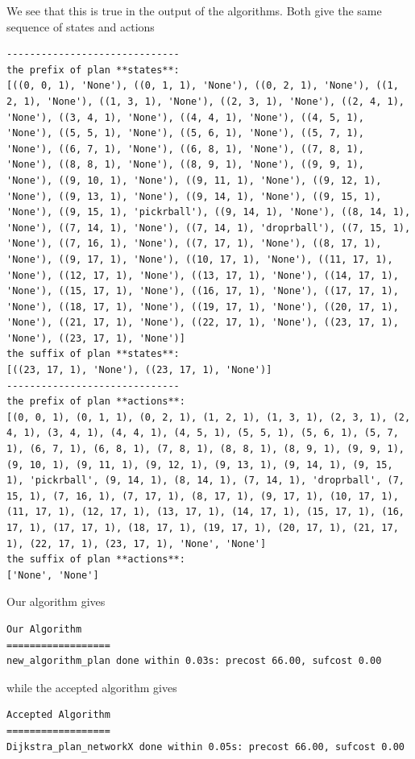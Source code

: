 We see that this is true in the output of the algorithms. Both give the same sequence of states and actions
\begin{lstlisting}
------------------------------
the prefix of plan **states**:
[((0, 0, 1), 'None'), ((0, 1, 1), 'None'), ((0, 2, 1), 'None'), ((1, 2, 1), 'None'), ((1, 3, 1), 'None'), ((2, 3, 1), 'None'), ((2, 4, 1), 'None'), ((3, 4, 1), 'None'), ((4, 4, 1), 'None'), ((4, 5, 1), 'None'), ((5, 5, 1), 'None'), ((5, 6, 1), 'None'), ((5, 7, 1), 'None'), ((6, 7, 1), 'None'), ((6, 8, 1), 'None'), ((7, 8, 1), 'None'), ((8, 8, 1), 'None'), ((8, 9, 1), 'None'), ((9, 9, 1), 'None'), ((9, 10, 1), 'None'), ((9, 11, 1), 'None'), ((9, 12, 1), 'None'), ((9, 13, 1), 'None'), ((9, 14, 1), 'None'), ((9, 15, 1), 'None'), ((9, 15, 1), 'pickrball'), ((9, 14, 1), 'None'), ((8, 14, 1), 'None'), ((7, 14, 1), 'None'), ((7, 14, 1), 'droprball'), ((7, 15, 1), 'None'), ((7, 16, 1), 'None'), ((7, 17, 1), 'None'), ((8, 17, 1), 'None'), ((9, 17, 1), 'None'), ((10, 17, 1), 'None'), ((11, 17, 1), 'None'), ((12, 17, 1), 'None'), ((13, 17, 1), 'None'), ((14, 17, 1), 'None'), ((15, 17, 1), 'None'), ((16, 17, 1), 'None'), ((17, 17, 1), 'None'), ((18, 17, 1), 'None'), ((19, 17, 1), 'None'), ((20, 17, 1), 'None'), ((21, 17, 1), 'None'), ((22, 17, 1), 'None'), ((23, 17, 1), 'None'), ((23, 17, 1), 'None')]
the suffix of plan **states**:
[((23, 17, 1), 'None'), ((23, 17, 1), 'None')]
------------------------------
the prefix of plan **actions**:
[(0, 0, 1), (0, 1, 1), (0, 2, 1), (1, 2, 1), (1, 3, 1), (2, 3, 1), (2, 4, 1), (3, 4, 1), (4, 4, 1), (4, 5, 1), (5, 5, 1), (5, 6, 1), (5, 7, 1), (6, 7, 1), (6, 8, 1), (7, 8, 1), (8, 8, 1), (8, 9, 1), (9, 9, 1), (9, 10, 1), (9, 11, 1), (9, 12, 1), (9, 13, 1), (9, 14, 1), (9, 15, 1), 'pickrball', (9, 14, 1), (8, 14, 1), (7, 14, 1), 'droprball', (7, 15, 1), (7, 16, 1), (7, 17, 1), (8, 17, 1), (9, 17, 1), (10, 17, 1), (11, 17, 1), (12, 17, 1), (13, 17, 1), (14, 17, 1), (15, 17, 1), (16, 17, 1), (17, 17, 1), (18, 17, 1), (19, 17, 1), (20, 17, 1), (21, 17, 1), (22, 17, 1), (23, 17, 1), 'None', 'None']
the suffix of plan **actions**:
['None', 'None']
\end{lstlisting}

Our algorithm gives 
\begin{lstlisting}
Our Algorithm
==================
new_algorithm_plan done within 0.03s: precost 66.00, sufcost 0.00
\end{lstlisting}
while the accepted algorithm gives 

\begin{lstlisting}
Accepted Algorithm
==================
Dijkstra_plan_networkX done within 0.05s: precost 66.00, sufcost 0.00
\end{lstlisting}


